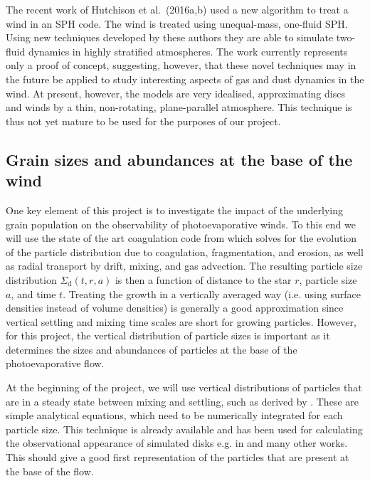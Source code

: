 \documentclass[10pt,fleqn,twoside]{article}
\begin{document}
The recent work of Hutchison et al.\ (2016a,b) used a new algorithm to
treat a wind in an SPH code. The wind is
treated using unequal-mass, one-fluid SPH. Using new techniques
developed by these authors they are able to simulate two-fluid dynamics
in highly stratified atmospheres. The work currently represents 
only a proof of concept, suggesting, however, that these novel
techniques may in 
the future be applied to study interesting aspects of gas and dust
dynamics in the wind. At present, however, the models are very
idealised, approximating discs and winds by a thin, non-rotating,
plane-parallel atmosphere.  This technique is thus not yet mature to
be used for the purposes of our project.

\subsection{Grain sizes and abundances at the base of the wind}

One key element of this project is to investigate the impact of the
underlying grain population on the observability of photoevaporative
winds. To this end we will use the state of the art coagulation code
from \citet{2010A&A...513A..79B} which solves for the evolution of the
particle distribution due to coagulation, fragmentation, and erosion,
as well as radial transport by drift, mixing, and gas advection. The
resulting particle size distribution $\Sigma_\mathrm{d}(t,r,a)$ is
then a function of distance to the star $r$, particle size $a$, and
time $t$. Treating the growth in a vertically averaged way (i.e.
using surface densities instead of volume densities) is generally a
good approximation since vertical settling and mixing time scales are
short for growing particles. However, for this project, the vertical
distribution of particle sizes is important as it determines the sizes
and abundances of particles at the base of the photoevaporative flow.

At the beginning of the project, we will use vertical distributions of
particles that are in a steady state between mixing and settling, such
as derived by \citet{2009A&A...496..597F}. These are simple analytical
equations, which need to be numerically integrated for each particle
size. This technique is already available and has been used for
calculating the observational appearance of simulated disks e.g.
in \citet{2015ApJ...813L..14B} and many other works. This should give
a good first representation of the particles that are present at the
base of the flow.
\end{document}

